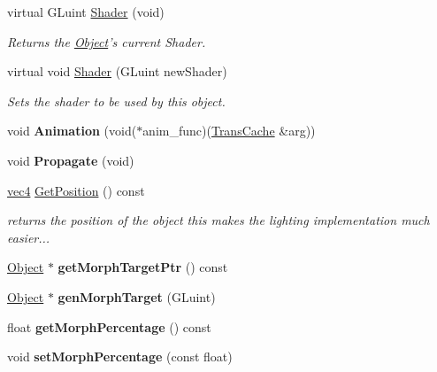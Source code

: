 \begin{DoxyCompactItemize}
\item 
virtual G\-Luint \hyperlink{class_object_a3dc857b837e8b77ba8a2727233400a5e}{Shader} (void)
\begin{DoxyCompactList}\small\item\em Returns the \hyperlink{class_object}{Object}'s current Shader. \end{DoxyCompactList}\item 
virtual void \hyperlink{class_object_aa52c30bca96800cecba55f446e147859}{Shader} (G\-Luint new\-Shader)
\begin{DoxyCompactList}\small\item\em Sets the shader to be used by this object. \end{DoxyCompactList}\item 
\hypertarget{class_object_ae3226b31c80c9f276ffdee65101c8fa6}{void {\bfseries Animation} (void($\ast$anim\-\_\-func)(\hyperlink{class_trans_cache}{Trans\-Cache} \&arg))}\label{class_object_ae3226b31c80c9f276ffdee65101c8fa6}

\item 
\hypertarget{class_object_ae09449132d3853e179d07d4d6bc0b695}{void {\bfseries Propagate} (void)}\label{class_object_ae09449132d3853e179d07d4d6bc0b695}

\item 
\hyperlink{struct_angel_1_1vec4}{vec4} \hyperlink{class_object_ae10497fea640753a3cb63f739aacc540}{Get\-Position} () const 
\begin{DoxyCompactList}\small\item\em returns the position of the object this makes the lighting implementation much easier... \end{DoxyCompactList}\item 
\hypertarget{class_object_aa60771518c07a0edf5aeee5584a571e0}{\hyperlink{class_object}{Object} $\ast$ {\bfseries get\-Morph\-Target\-Ptr} () const }\label{class_object_aa60771518c07a0edf5aeee5584a571e0}

\item 
\hypertarget{class_object_af4d40010633d77ff47e75d40e3129894}{\hyperlink{class_object}{Object} $\ast$ {\bfseries gen\-Morph\-Target} (G\-Luint)}\label{class_object_af4d40010633d77ff47e75d40e3129894}

\item 
\hypertarget{class_object_a275903685e300433a5120b5558eb9aa1}{float {\bfseries get\-Morph\-Percentage} () const }\label{class_object_a275903685e300433a5120b5558eb9aa1}

\item 
\hypertarget{class_object_aea00114a91aeb779b4f03c7bebaa326e}{void {\bfseries set\-Morph\-Percentage} (const float)}\label{class_object_aea00114a91aeb779b4f03c7bebaa326e}


\end{DoxyCompactItemize}

